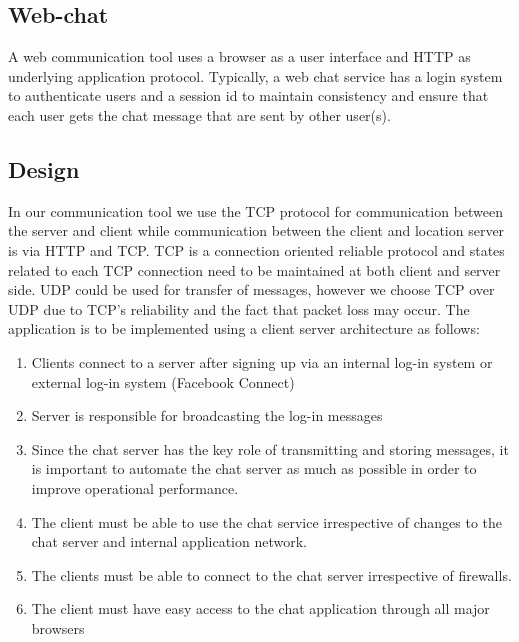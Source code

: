 \documentclass[12pt]{article}
\begin{document}
\subsection{Web-chat} 
A web communication tool uses a browser as a user interface and HTTP as underlying 
application protocol. Typically, a web chat service has a login system to 
authenticate users and a session id to maintain consistency and ensure that each 
user gets the chat message that are sent by other user(s).  

\subsection{Design} 
In our communication tool we use the TCP protocol for communication between the server 
and client while communication between the client and location server is via HTTP and TCP. 
TCP is a connection oriented reliable protocol and states related to each TCP 
connection need to be maintained at both client and server side. UDP could be used 
for transfer of messages, however we choose TCP over UDP due to TCP's reliability and the fact
that packet loss may occur.  The application is to be implemented using a
client server architecture as follows: 

\begin{enumerate} 
\item Clients connect to a server after signing up via an internal log-in system or external log-in
system (Facebook Connect) 
\item Server is responsible for broadcasting the log-in messages 
\item Since the chat server has the key role of transmitting and storing messages, it is 
important to automate the chat server as much as possible in order to improve operational performance.  
\item The client must be able to use the chat service irrespective of changes to the chat server and internal application
network.  
\item The clients must be able to connect to the chat server irrespective of firewalls.  
\item The client must have easy access to the chat
application through all major browsers 
\end{enumerate} 
\end{document}
